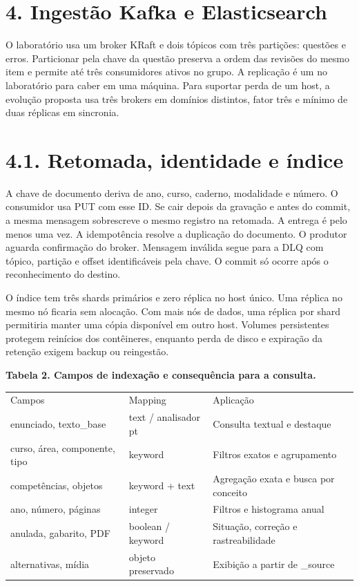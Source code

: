\documentclass[12pt,a4paper]{article}
\begin{document}
\section*{4. Ingestão Kafka e Elasticsearch}
O laboratório usa um broker KRaft e dois tópicos com três partições: questões e erros. Particionar pela chave da questão preserva a ordem das revisões do mesmo item e permite até três consumidores ativos no grupo. A replicação é um no laboratório para caber em uma máquina. Para suportar perda de um host, a evolução proposta usa três brokers em domínios distintos, fator três e mínimo de duas réplicas em sincronia.

\clearpage
\section*{4.1. Retomada, identidade e índice}
A chave de documento deriva de ano, curso, caderno, modalidade e número. O consumidor usa PUT com esse ID. Se cair depois da gravação e antes do commit, a mesma mensagem sobrescreve o mesmo registro na retomada. A entrega é pelo menos uma vez. A idempotência resolve a duplicação do documento. O produtor aguarda confirmação do broker. Mensagem inválida segue para a DLQ com tópico, partição e offset identificáveis pela chave. O commit só ocorre após o reconhecimento do destino.

O índice tem três shards primários e zero réplica no host único. Uma réplica no mesmo nó ficaria sem alocação. Com mais nós de dados, uma réplica por shard permitiria manter uma cópia disponível em outro host. Volumes persistentes protegem reinícios dos contêineres, enquanto perda de disco e expiração da retenção exigem backup ou reingestão.

\begin{center}\small\textbf{Tabela 2. Campos de indexação e consequência para a consulta.}\par
\begin{tabularx}{\linewidth}{XXX}\toprule
Campos & Mapping & Aplicação \\
enunciado, texto\_base & text / analisador pt & Consulta textual e destaque \\
curso, área, componente, tipo & keyword & Filtros exatos e agrupamento \\
competências, objetos & keyword + text & Agregação exata e busca por conceito \\
ano, número, páginas & integer & Filtros e histograma anual \\
anulada, gabarito, PDF & boolean / keyword & Situação, correção e rastreabilidade \\
alternativas, mídia & objeto preservado & Exibição a partir de \_source \\
\bottomrule\end{tabularx}\end{center}
\end{document}

